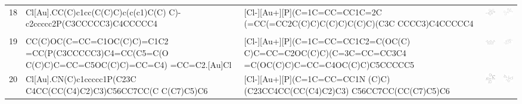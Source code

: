 \begin{landscape}
\begin{longtable}{m{0.3cm}m{6.7cm}m{7.7cm}m{2.3cm}m{2.3cm}}
 18 &
 Cl[Au].CC(C)c1cc(C(C)C)c(c(c1)C(C) C)-c2ccccc2P(C3CCCCC3)C4CCCCC4 & 
 [Cl-][Au+][P](C=1C=CC=CC1C=2C (=CC(=CC2C(C)C)C(C)C)C(C)C)(C3C CCCC3)C4CCCCC4 & 
 \includegraphics[width=2.2cm]{imagenes/sigmaAldrich/Chloro[2-dicyclohexyl(2,4,6-trisopropylbiphenyl)phosphine]gold(I).png} & 
 \includegraphics[width=2.2cm]{imagenes/sciFinder/pdf/Chloro[2-dicyclohexyl(2,4,6-trisopropylbiphenyl)phosphine]gold(I).pdf} \\

\\ %

 19 &
 CC(C)OC(C=CC=C1OC(C)C)=C1C2 =CC(P(C3CCCCC3)C4=CC(C5=C(O C(C)C)C=CC=C5OC(C)C)=CC=C4) =CC=C2.[Au]Cl & 
 [Cl-][Au+][P](C=1C=CC=CC1C2=C(OC(C) C)C=CC=C2OC(C)C)(C=3C=CC=CC3C4 =C(OC(C)C)C=CC=C4OC(C)C)C5CCCCC5 & 
 \includegraphics[width=2.2cm]{imagenes/sigmaAldrich/pdf/BisPhePhos XD gold(I) chloride.pdf} & 
 \includegraphics[width=2.2cm]{imagenes/sciFinder/pdf/BisPhePhos XD gold(I) chloride.pdf} \\



 20 &
 Cl[Au].CN(C)c1ccccc1P(C23C C4CC(CC(C4)C2)C3)C56CC7CC(C C(C7)C5)C6 & 
 [Cl-][Au+][P](C=1C=CC=CC1N (C)C)(C23CC4CC(CC(C4)C2)C3) C56CC7CC(CC(C7)C5)C6 & 
 \includegraphics[width=2.2cm]{imagenes/sigmaAldrich/Chloro[di(1-adamantyl)-2-dimethylaminophenylphosphine]gold(I).png} & 
 \includegraphics[width=2.2cm]{imagenes/sciFinder/pdf/Chloro[di(1-adamantyl)-2-dimethylaminophenylphosphine]gold(I).pdf} \\






\end{longtable}
\end{landscape}
